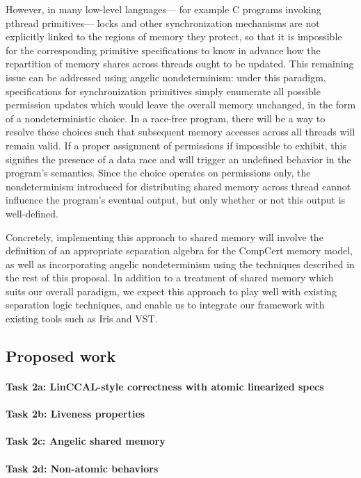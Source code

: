 However,
in many low-level languages---%
for example C programs invoking \textsf{pthread} primitives---%
locks and other synchronization mechanisms
are not explicitly linked to the regions of memory they protect,
so that it is impossible for the corresponding primitive specifications
to know in advance how the repartition of memory shares across threads
ought to be updated.
This remaining issue can be addressed using angelic nondeterminism:
under this paradigm, specifications for synchronization primitives
simply enumerate all possible permission updates
which would leave the overall memory unchanged,
in the form of a nondeterministic choice.
In a race-free program,
there will be a way to resolve these choices
such that subsequent memory accesses across all threads will remain valid.
If a proper assignment of permissions if impossible to exhibit,
this signifies the presence of a data race and
will trigger an undefined behavior in the program's semantics.
Since the choice operates on permissions only,
the nondeterminism introduced for distributing shared memory
across thread cannot influence the program's eventual output,
but only whether or not this output is well-defined.

Concretely,
implementing this approach to shared memory
will involve the definition of an appropriate separation algebra
for the CompCert memory model,
as well as incorporating angelic nondeterminism
using the techniques described in the rest of this proposal.
In addition to a treatment of shared memory
which suits our overall paradigm,
we expect this approach to play well with existing separation logic techniques,
and enable us to integrate our framework with
existing tools such as Iris and VST.

%

\subsection{Proposed work}

\paragraph{Task 2a: LinCCAL-style correctness with atomic linearized specs}

\paragraph{Task 2b: Liveness properties}

\paragraph{Task 2c: Angelic shared memory}

\paragraph{Task 2d: Non-atomic behaviors}

